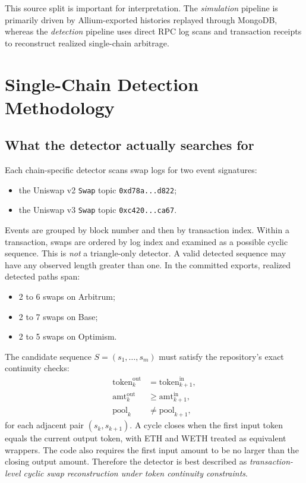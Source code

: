 \documentclass[11pt]{article}
\begin{document}
This source split is important for interpretation. The \emph{simulation} pipeline is primarily driven by Allium-exported histories replayed through MongoDB, whereas the \emph{detection} pipeline uses direct RPC log scans and transaction receipts to reconstruct realized single-chain arbitrage.

\section{Single-Chain Detection Methodology}

\subsection{What the detector actually searches for}

Each chain-specific detector scans swap logs for two event signatures:
\begin{itemize}[leftmargin=1.5em]
    \item the Uniswap v2 \texttt{Swap} topic \texttt{0xd78a...d822};
    \item the Uniswap v3 \texttt{Swap} topic \texttt{0xc420...ca67}.
\end{itemize}

Events are grouped by block number and then by transaction index. Within a transaction, swaps are ordered by log index and examined as a possible cyclic sequence. This is \emph{not} a triangle-only detector. A valid detected sequence may have any observed length greater than one. In the committed exports, realized detected paths span:
\begin{itemize}[leftmargin=1.5em]
    \item 2 to 6 swaps on Arbitrum;
    \item 2 to 7 swaps on Base;
    \item 2 to 5 swaps on Optimism.
\end{itemize}

The candidate sequence \(S=(s_1,\dots,s_m)\) must satisfy the repository's exact continuity checks:
\begin{align}
\text{token}^{\mathrm{out}}_k &= \text{token}^{\mathrm{in}}_{k+1}, \\
\text{amt}^{\mathrm{out}}_k &\ge \text{amt}^{\mathrm{in}}_{k+1}, \\
\text{pool}_k &\neq \text{pool}_{k+1},
\end{align}
for each adjacent pair \((s_k,s_{k+1})\). A cycle closes when the first input token equals the current output token, with ETH and WETH treated as equivalent wrappers. The code also requires the first input amount to be no larger than the closing output amount. Therefore the detector is best described as \emph{transaction-level cyclic swap reconstruction under token continuity constraints}.
\end{document}
